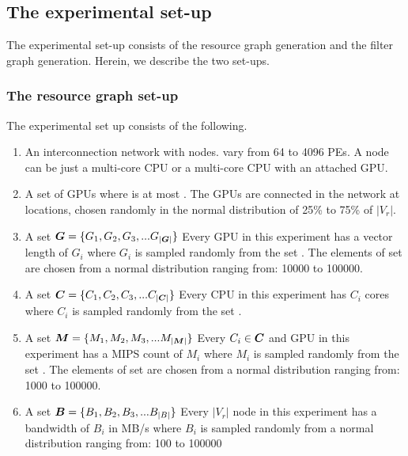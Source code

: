 \subsection{The experimental set-up}
\label{sec:experimental-setup}

The experimental set-up consists of the resource graph generation and the
filter graph generation. Herein, we describe the two set-ups.

\subsubsection{The resource graph set-up}
\label{sec:resource-graph-setup}

The experimental set up consists of the following.

\begin{enumerate}

\item An interconnection network with \numtplgynodes
  nodes. \numtplgynodes vary from 64 to 4096 PEs. A node can be just a
  multi-core CPU or a multi-core CPU with an attached GPU.

\item A set of \gpunum GPUs where \gpunum is at most \numtplgynodes. The
  GPUs are connected in the network at locations, chosen randomly in the
  normal distribution of 25\% to 75\% of $|V_r|$.

\item A set $\bm{G} = \{G_1, G_2, G_3, ... G_{|\bm{G}|}\}$
  Every GPU in this experiment has a vector
  length of $G_i$ where $G_i$ is sampled randomly from the set
  \veclenset. The elements of set \veclenset are chosen from a normal
  distribution ranging from: 10000 to 100000.

\item A set $\bm{C} = \{C_1, C_2, C_3, ... C_{|\bm{C}|}\}$
  Every CPU in this experiment has $C_i$
  cores where $C_i$ is sampled randomly from the set \corenumset.

\item A set $\bm{M} = \{M_1, M_2, M_3, ... M_{|\bm{M}|}\}$
   Every $C_i \in \bm{C}$ and GPU in this
  experiment has a MIPS count of $M_i$ where $M_i$ is sampled randomly
  from the set \mipsset. The elements of set \mipsset are chosen from a
  normal distribution ranging from: 1000 to 100000.

\item A set $\bm{B} = \{B_1, B_2, B_3, ... B_{|B|}\}$
  Every $|V_r|$ node in this experiment has a bandwidth of $B_i$ in MB/s where $B_i$
  is sampled randomly from a normal distribution ranging from: 100 to 100000

\end{enumerate}

